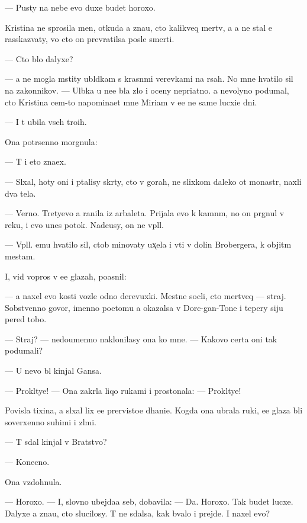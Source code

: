 \documentclass[10pt]{book}
\begin{document}
— Pusty na nebe {\y}evo duxe budet horoxo.

Kristina ne sprosila men{\ia}, otkuda {\y}a zna{\y}u, cto kalikveq mertv, a {\y}a ne stal {\y}e{\y} rasskaz{\yi}vaty, vo cto on prevratilsa posle smerti.

— Cto b{\yi}lo dalyxe?

— {\Y}a ne mogla mstity ubl{\iu}dkam s krasn{\yi}mi verevkami na r{\ia}sah. No mne hvatilo sil na zakonnikov. — Ul{\yi}bka u ne{\y}e b{\yi}la zlo{\y} i oceny nepri{\y}atno{\y}. {\Y}a nevolyno podumal, cto Kristina cem-to napomina{\y}et mne Miriam v {\y}e{\y}e ne sam{\yi}{\y}e lucxi{\y}e dni.

— I t{\yi} ubila vseh tro{\y}ih.

Ona potr{\ia}senno morgnula:

— T{\yi} i eto zna{\y}ex.

— Sl{\yi}xal, hoty oni i p{\yi}talisy skr{\yi}ty, cto v gorah, ne slixkom daleko ot monast{\yi}r{\ia}, naxli dva tela.

— Verno. Tretyevo {\y}a ranila iz arbaleta. Prijala {\y}evo k kamn{\ia}m, no on pr{\yi}gnul v reku, i {\y}evo unes potok. Nade{\y}usy, on ne v{\yi}pl{\yi}l.

— V{\yi}pl{\yi}l. {\Y}emu hvatilo sil, ctob{\yi} minovaty ux̨el{\y}a i v{\yi}{\y}ti v dolin{\yi} Brobergera, k objit{\yi}m mestam.

I, vid{\ia} vopros v {\y}e{\y}e glazah, po{\y}asnil:

— {\Y}a naxel {\y}evo kosti vozle odno{\y} derevuxki. Mestn{\yi}{\y}e socli, cto mertveq — straj. Sobstvenno govor{\ia}, imenno poetomu {\y}a okazalsa v Dorc-gan-To{\y}ne i tepery siju pered tobo{\y}.

— Straj? — nedoumenno naklonilasy ona ko mne. — Kakovo certa oni tak podumali?

— U nevo b{\yi}l kinjal Gansa.

— Prokl{\ia}tye! — Ona zakr{\yi}la liqo rukami i prostonala: — Prokl{\ia}tye!

Povisla tixina, {\y}a sl{\yi}xal lix {\y}e{\y}e prer{\yi}visto{\y}e d{\yi}hani{\y}e. Kogda ona ubrala ruki, {\y}e{\y}e glaza b{\yi}li soverxenno suhimi i zl{\yi}mi.

— T{\yi} sdal kinjal v Bratstvo?

— Konecno.

Ona vzdohnula.

— Horoxo. — I, slovno ubejda{\y}a seb{\ia}, dobavila: — Da. Horoxo. Tak budet lucxe. Dalyxe {\y}a zna{\y}u, cto slucilosy. T{\yi} ne sdalsa, kak b{\yi}valo i prejde. I naxel {\y}evo?
\end{document}
